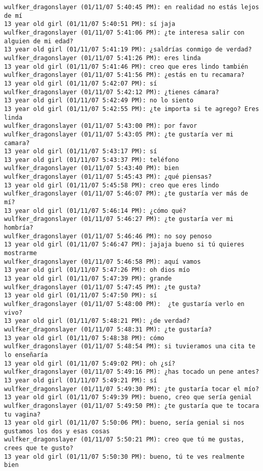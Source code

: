\begin{verbatim}
wulfker_dragonslayer (01/11/07 5:40:45 PM): en realidad no estás lejos de mí
13 year old girl (01/11/07 5:40:51 PM): sí jaja
wulfker_dragonslayer (01/11/07 5:41:06 PM): ¿te interesa salir con alguien de mi edad?
13 year old girl (01/11/07 5:41:19 PM): ¿saldrías conmigo de verdad?
wulfker_dragonslayer (01/11/07 5:41:26 PM): eres linda
13 year old girl (01/11/07 5:41:46 PM): creo que eres lindo también
wulfker_dragonslayer (01/11/07 5:41:56 PM): ¿estás en tu recamara?
13 year old girl (01/11/07 5:42:07 PM): sí
wulfker_dragonslayer (01/11/07 5:42:12 PM): ¿tienes cámara?
13 year old girl (01/11/07 5:42:49 PM): no lo siento
13 year old girl (01/11/07 5:42:55 PM): ¿te importa si te agrego? Eres linda
wulfker_dragonslayer (01/11/07 5:43:00 PM): por favor
wulfker_dragonslayer (01/11/07 5:43:05 PM): ¿te gustaría ver mi camara?
13 year old girl (01/11/07 5:43:17 PM): sí
13 year old girl (01/11/07 5:43:37 PM): teléfono
wulfker_dragonslayer (01/11/07 5:43:40 PM): bien
wulfker_dragonslayer (01/11/07 5:45:43 PM): ¿qué piensas?
13 year old girl (01/11/07 5:45:58 PM): creo que eres lindo
wulfker_dragonslayer (01/11/07 5:46:07 PM): ¿te gustaría ver más de mí?
13 year old girl (01/11/07 5:46:14 PM): ¿cómo qué?
wulfker_dragonslayer (01/11/07 5:46:27 PM): ¿te gustaría ver mi hombría?
wulfker_dragonslayer (01/11/07 5:46:46 PM): no soy penoso
13 year old girl (01/11/07 5:46:47 PM): jajaja bueno si tú quieres mostrarme
wulfker_dragonslayer (01/11/07 5:46:58 PM): aquí vamos
13 year old girl (01/11/07 5:47:26 PM): oh dios mío
13 year old girl (01/11/07 5:47:39 PM): grande
wulfker_dragonslayer (01/11/07 5:47:45 PM): ¿te gusta?
13 year old girl (01/11/07 5:47:50 PM): sí
wulfker_dragonslayer (01/11/07 5:48:00 PM):  ¿te gustaría verlo en vivo?
13 year old girl (01/11/07 5:48:21 PM): ¿de verdad?
wulfker_dragonslayer (01/11/07 5:48:31 PM): ¿te gustaría?
13 year old girl (01/11/07 5:48:38 PM): cómo
wulfker_dragonslayer (01/11/07 5:48:54 PM): si tuvieramos una cita te lo enseñaría
13 year old girl (01/11/07 5:49:02 PM): oh ¿sí?
wulfker_dragonslayer (01/11/07 5:49:16 PM): ¿has tocado un pene antes?
13 year old girl (01/11/07 5:49:21 PM): sí
wulfker_dragonslayer (01/11/07 5:49:30 PM): ¿te gustaría tocar el mío?
13 year old girl (01/11/07 5:49:39 PM): bueno, creo que sería genial
wulfker_dragonslayer (01/11/07 5:49:50 PM): ¿te gustaría que te tocara tu vagina?
13 year old girl (01/11/07 5:50:06 PM): bueno, sería genial si nos gustamos los dos y esas cosas
wulfker_dragonslayer (01/11/07 5:50:21 PM): creo que tú me gustas, crees que te gusto?
13 year old girl (01/11/07 5:50:30 PM): bueno, tú te ves realmente bien

\end{verbatim}
